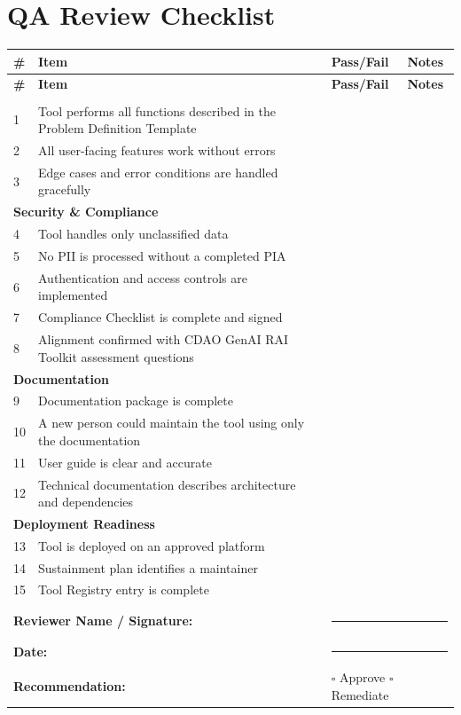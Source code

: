 \documentclass[11pt,letterpaper]{article}
\begin{document}
\section{QA Review Checklist}
\label{app:qa-checklist}

\begin{longtable}{@{}p{0.6cm}p{7.6cm}p{1.9cm}p{3cm}@{}}
\toprule
\textbf{\#} & \textbf{Item} & \textbf{Pass/Fail} & \textbf{Notes} \\
\midrule
\endfirsthead
\toprule
\textbf{\#} & \textbf{Item} & \textbf{Pass/Fail} & \textbf{Notes} \\
\midrule
\endhead
\bottomrule
\endlastfoot
\multicolumn{4}{l}{\textbf{Functionality}} \\
\midrule
1 & Tool performs all functions described in the Problem Definition Template & & \\
\midrule
2 & All user-facing features work without errors & & \\
\midrule
3 & Edge cases and error conditions are handled gracefully & & \\
\midrule
\multicolumn{4}{l}{\textbf{Security \& Compliance}} \\
\midrule
4 & Tool handles only unclassified data & & \\
\midrule
5 & No PII is processed without a completed PIA & & \\
\midrule
6 & Authentication and access controls are implemented & & \\
\midrule
7 & Compliance Checklist is complete and signed & & \\
\midrule
8 & Alignment confirmed with CDAO GenAI RAI Toolkit assessment questions & & \\
\midrule
\multicolumn{4}{l}{\textbf{Documentation}} \\
\midrule
9 & Documentation package is complete & & \\
\midrule
10 & A new person could maintain the tool using only the documentation & & \\
\midrule
11 & User guide is clear and accurate & & \\
\midrule
12 & Technical documentation describes architecture and dependencies & & \\
\midrule
\multicolumn{4}{l}{\textbf{Deployment Readiness}} \\
\midrule
13 & Tool is deployed on an approved platform & & \\
\midrule
14 & Sustainment plan identifies a maintainer & & \\
\midrule
15 & Tool Registry entry is complete & & \\
\midrule
\multicolumn{4}{l}{} \\
\midrule
\multicolumn{2}{l}{\textbf{Reviewer Name / Signature:}} & \multicolumn{2}{l}{\rule{5cm}{0.4pt}} \\
\midrule
\multicolumn{2}{l}{\textbf{Date:}} & \multicolumn{2}{l}{\rule{5cm}{0.4pt}} \\
\midrule
\multicolumn{2}{l}{\textbf{Recommendation:}} & \multicolumn{2}{l}{$\square$ Approve \quad $\square$ Remediate} \\
\end{longtable}
\end{document}
